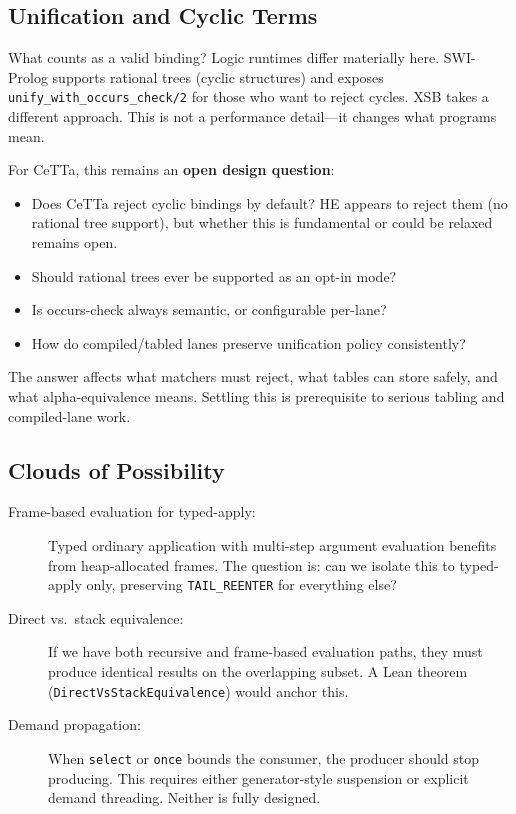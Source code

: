 \documentclass[11pt]{article}
\newcommand{\code}[1]{\texttt{#1}}
\newcommand{\HE}{\textup{HE}}
\newcommand{\CeTTa}{\textup{CeTTa}}
\newcommand{\XSB}{\textup{XSB}}
\begin{document}
\subsection{Unification and Cyclic Terms}

What counts as a valid binding?  Logic runtimes differ materially here.
SWI-Prolog supports rational trees (cyclic structures) and exposes
\code{unify\_with\_occurs\_check/2} for those who want to reject cycles.
\XSB{} takes a different approach.  This is not a performance detail---it
changes what programs mean.

For \CeTTa{}, this remains an \textbf{open design question}:
\begin{itemize}
\item Does \CeTTa{} reject cyclic bindings by default?  \HE{} appears to
  reject them (no rational tree support), but whether this is fundamental
  or could be relaxed remains open.
\item Should rational trees ever be supported as an opt-in mode?
\item Is occurs-check always semantic, or configurable per-lane?
\item How do compiled/tabled lanes preserve unification policy consistently?
\end{itemize}

The answer affects what matchers must reject, what tables can store safely,
and what alpha-equivalence means.  Settling this is prerequisite to
serious tabling and compiled-lane work.

\subsection{Clouds of Possibility}

\begin{description}
\item[Frame-based evaluation for typed-apply:]
  Typed ordinary application with multi-step argument evaluation benefits
  from heap-allocated frames.  The question is: can we isolate this to
  typed-apply only, preserving \code{TAIL\_REENTER} for everything else?
\item[Direct vs.\ stack equivalence:]
  If we have both recursive and frame-based evaluation paths, they must
  produce identical results on the overlapping subset.  A Lean theorem
  (\code{DirectVsStackEquivalence}) would anchor this.
\item[Demand propagation:]
  When \code{select} or \code{once} bounds the consumer, the producer
  should stop producing.  This requires either generator-style
  suspension or explicit demand threading.  Neither is fully designed.
\end{description}
\end{document}
